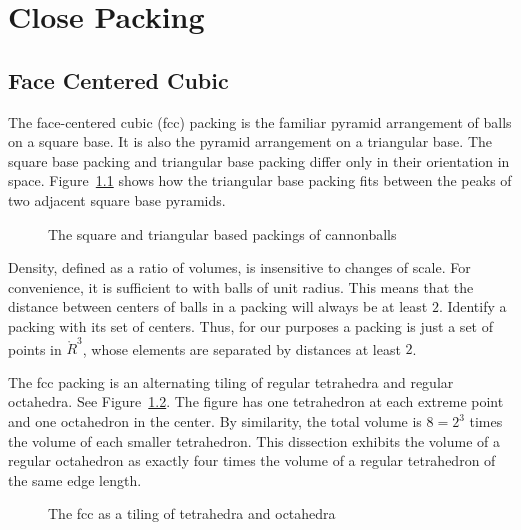 

\chapter{Close Packing}
\section{Face Centered Cubic}



The face-centered cubic (fcc) packing is the familiar pyramid arrangement of
balls on a square base.  It is also the pyramid arrangement on a
triangular base.  The square base packing and triangular base packing
differ only in their orientation in space.
Figure~\ref{fig:tri-square-cannonballs} shows how the triangular base
packing fits between the peaks of two adjacent square base pyramids.

\begin{figure}[htb]
  \centering
  \caption{The square and triangular based packings of cannonballs}
  \label{fig:tri-square-cannonballs}
\end{figure}

Density, defined as a ratio of volumes, is insensitive to changes of
scale.  For convenience, it is sufficient to with balls of unit
radius. This means that the distance between centers of balls in a
packing will always be at least $2$.  Identify a packing with its set
of centers.  Thus, for our purposes a packing is just a set of points
in $\ring{R}^3$, whose elements are separated by distances at least
$2$.


The fcc packing is an alternating tiling of regular tetrahedra and
regular octahedra.  See Figure~\ref{fig:tet-oct}.  The figure has one
tetrahedron at each extreme point and one octahedron in the center. By
similarity, the total volume is $8 = 2^3$ times the volume of each
smaller tetrahedron. This dissection exhibits the volume of a regular
octahedron as exactly four times the volume of a regular tetrahedron
of the same edge length.

\begin{figure}[htb]
  \centering
  \caption{The fcc as a tiling of tetrahedra and octahedra}
  \label{fig:tet-oct}
\end{figure}

